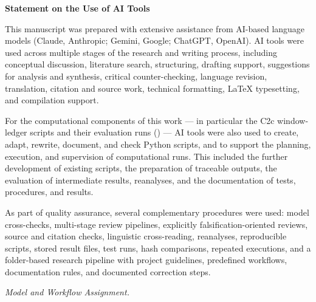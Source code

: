 \documentclass[12pt,a4paper]{article}
\theoremstyle{definition}
\theoremstyle{remark}
\begin{document}
\noindent\textbf{Statement on the Use of AI Tools}

\smallskip
\small

\begin{sloppypar}
\noindent
This manuscript was prepared with extensive assistance from AI-based
language models (Claude, Anthropic; Gemini, Google; ChatGPT, OpenAI).
AI tools were used across multiple stages of the research and writing
process, including conceptual discussion, literature search, structuring,
drafting support, suggestions for analysis and synthesis, critical
counter-checking, language revision, translation, citation and source work,
technical formatting, \LaTeX{} typesetting, and compilation support.
\end{sloppypar}

\medskip

\noindent
For the computational components of this work --- in particular the C2c
window-ledger scripts and their evaluation runs
() --- AI tools were also used to create, adapt,
rewrite, document, and check Python scripts, and to support the planning,
execution, and supervision of computational runs. This included the further
development of existing scripts, the preparation of traceable outputs, the
evaluation of intermediate results, reanalyses, and the documentation of
tests, procedures, and results.

\medskip

\noindent
As part of quality assurance, several complementary procedures were used:
model cross-checks, multi-stage review pipelines, explicitly
falsification-oriented reviews, source and citation checks, linguistic
cross-reading, reanalyses, reproducible scripts, stored result files, test
runs, hash comparisons, repeated executions, and a folder-based research
pipeline with project guidelines, predefined workflows, documentation
rules, and documented correction steps.

\medskip

\noindent\textit{Model and Workflow Assignment.}

\medskip
\end{document}
